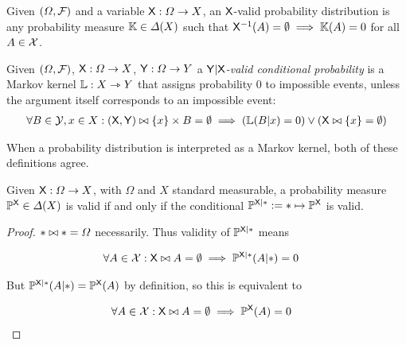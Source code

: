 \begin{definition}\label{def:valid_dist}
Given $(\Omega,\mathcal{F})$ and a variable $\mathsf{X}:\Omega\to X$, an $\mathsf{X}$-valid probability distribution is any probability measure $\mathbb{K}\in \Delta(X)$ such that $\mathsf{X}^{-1}(A)=\emptyset\implies \mathbb{K}(A) = 0$ for all $A\in\mathcal{X}$.
\end{definition}

\begin{definition}\label{def:valid_conditional_prob}
Given $(\Omega,\mathcal{F})$, $\mathsf{X}:\Omega\to X$, $\mathsf{Y}:\Omega\to Y$ a \emph{$\mathsf{Y}|\mathsf{X}$-valid conditional probability} is a Markov kernel $\mathbb{L}:X\rightarrowtriangle Y$ that assigns probability 0 to impossible events, unless the argument itself corresponds to an impossible event:
\begin{align}
    \forall B\in \mathcal{Y}, x\in X: (\mathsf{X},\mathsf{Y})\bowtie \{x\}\times B = \emptyset \implies \left(\mathbb{L}(B|x) = 0\right) \lor \left(\mathsf{X}\bowtie \{x\} = \emptyset\right)
\end{align}
\end{definition}

When a probability distribution is interpreted as a Markov kernel, both of these definitions agree.

\begin{theorem}\label{th:valid_agree}
Given $\mathsf{X}:\Omega\to X$, with $\Omega$ and $X$ standard measurable, a probability measure $\mathbb{P}^{\mathsf{X}}\in \Delta(X)$ is valid if and only if the conditional $\mathbb{P}^{\mathsf{X}|*}:=*\mapsto \mathbb{P}^{\mathsf{X}}$ is valid.
\end{theorem}

\begin{proof}
$*\bowtie *=\Omega$ necessarily. Thus validity of $\mathbb{P}^{\mathsf{X}|*}$ means 

\begin{align}
    \forall A\in \mathcal{X}: \mathsf{X}\bowtie A=\emptyset \implies \mathbb{P}^{\mathsf{X}|*}(A|*)&=0
\end{align}

But $\mathbb{P}^{\mathsf{X}|*}(A|*)=\mathbb{P}^{\mathsf{X}}(A)$ by definition, so this is equivalent to

\begin{align}
    \forall A\in \mathcal{X}: \mathsf{X}\bowtie A=\emptyset \implies \mathbb{P}^{\mathsf{X}}(A)&=0
\end{align}
\end{proof}

